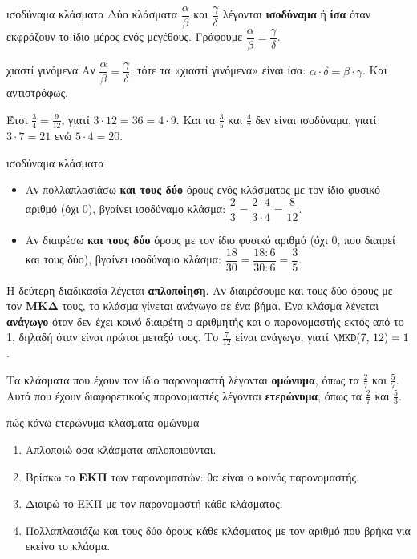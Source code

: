 
\begin{orismos}{ισοδύναμα κλάσματα}
Δύο κλάσματα $\dfrac{\alpha}{\beta}$ και $\dfrac{\gamma}{\delta}$ λέγονται \textbf{ισοδύναμα} ή \textbf{ίσα} όταν εκφράζουν το ίδιο μέρος ενός μεγέθους. Γράφουμε $\dfrac{\alpha}{\beta}=\dfrac{\gamma}{\delta}$.
\end{orismos}

\begin{idiotita}{χιαστί γινόμενα}
Αν $\dfrac{\alpha}{\beta}=\dfrac{\gamma}{\delta}$, τότε τα «χιαστί γινόμενα» είναι ίσα: $\alpha\cdot\delta=\beta\cdot\gamma$. Και αντιστρόφως.
\end{idiotita}

Έτσι $\frac{3}{4}=\frac{9}{12}$, γιατί $3\cdot 12=36=4\cdot 9$. Και τα $\frac{3}{5}$ και $\frac{4}{7}$ δεν είναι ισοδύναμα, γιατί $3\cdot 7=21$ ενώ $5\cdot 4=20$.

\begin{kanonas}{ισοδύναμα κλάσματα}
\begin{itemize}[leftmargin=1.2em,itemsep=0.3ex,topsep=2pt]
\item Αν πολλαπλασιάσω \textbf{και τους δύο} όρους ενός κλάσματος με τον ίδιο φυσικό αριθμό (όχι 0), βγαίνει ισοδύναμο κλάσμα: $\dfrac{2}{3}=\dfrac{2\cdot 4}{3\cdot 4}=\dfrac{8}{12}$.
\item Αν διαιρέσω \textbf{και τους δύο} όρους με τον ίδιο φυσικό αριθμό (όχι 0, που διαιρεί και τους δύο), βγαίνει ισοδύναμο κλάσμα: $\dfrac{18}{30}=\dfrac{18:6}{30:6}=\dfrac{3}{5}$.
\end{itemize}
\end{kanonas}

Η δεύτερη διαδικασία λέγεται \textbf{απλοποίηση}. Αν διαιρέσουμε και τους δύο όρους με τον \textbf{ΜΚΔ} τους, το κλάσμα γίνεται ανάγωγο σε ένα βήμα. Ένα κλάσμα λέγεται \textbf{ανάγωγο} όταν δεν έχει κοινό διαιρέτη ο αριθμητής και ο παρονομαστής εκτός από το 1, δηλαδή όταν είναι πρώτοι μεταξύ τους. Το $\frac{7}{12}$ είναι ανάγωγο, γιατί $\MKD(7,\,12)=1$.


Τα κλάσματα που έχουν τον ίδιο παρονομαστή λέγονται \textbf{ομώνυμα}, όπως τα $\frac{2}{7}$ και $\frac{5}{7}$. Αυτά που έχουν διαφορετικούς παρονομαστές λέγονται \textbf{ετερώνυμα}, όπως τα $\frac{2}{7}$ και $\frac{5}{3}$.

\begin{kanonas}{πώς κάνω ετερώνυμα κλάσματα ομώνυμα}
\begin{enumerate}[leftmargin=1.6em,itemsep=0.2ex,topsep=2pt]
\item Απλοποιώ όσα κλάσματα απλοποιούνται.
\item Βρίσκω το \textbf{ΕΚΠ} των παρονομαστών: θα είναι ο κοινός παρονομαστής.
\item Διαιρώ το ΕΚΠ με τον παρονομαστή κάθε κλάσματος.
\item Πολλαπλασιάζω και τους δύο όρους κάθε κλάσματος με τον αριθμό που βρήκα για εκείνο το κλάσμα.
\end{enumerate}
\end{kanonas}

